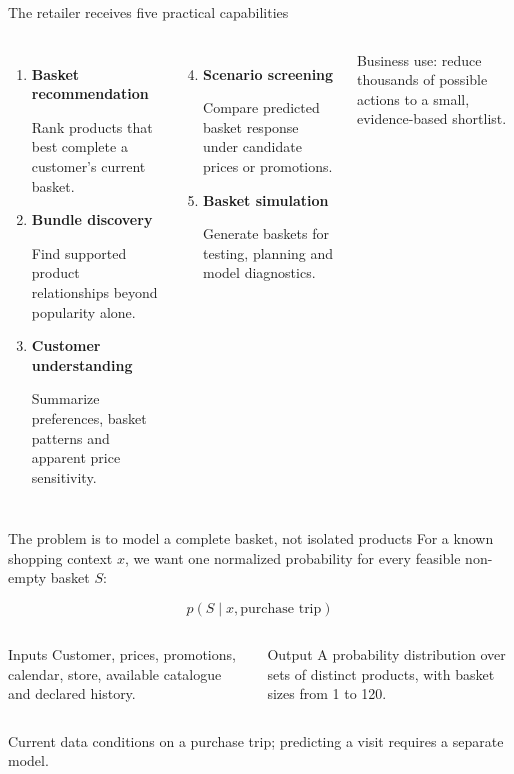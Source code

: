 \documentclass[aspectratio=169,11pt,t]{beamer}
\newcommand{\blue}[1]{\textcolor{Accent}{#1}}
\begin{document}
\begin{frame}{The retailer receives five practical capabilities}
\begin{columns}[T,onlytextwidth]
  \begin{enumerate}
    \item \textbf{Basket recommendation}\par
          Rank products that best complete a customer's current basket.
    \item \textbf{Bundle discovery}\par
          Find supported product relationships beyond popularity alone.
    \item \textbf{Customer understanding}\par
          Summarize preferences, basket patterns and apparent price sensitivity.
  \end{enumerate}

  \begin{enumerate}
    \setcounter{enumi}{3}
    \item \textbf{Scenario screening}\par
          Compare predicted basket response under candidate prices or promotions.
    \item \textbf{Basket simulation}\par
          Generate baskets for testing, planning and model diagnostics.
  \end{enumerate}

  \vspace{0.12cm}
  \blue{Business use: reduce thousands of possible actions to a small,
  evidence-based shortlist.}
\end{columns}
\end{frame}

\begin{frame}{The problem is to model a complete basket, not isolated products}
\small
For a known shopping context $x$, we want one normalized probability for every feasible
non-empty basket $S$:

\[
\boxed{\quad p(S\mid x,\text{purchase trip})\quad}
\]

\begin{columns}[T,onlytextwidth]
  \begin{block}{Inputs}
  Customer, prices, promotions, calendar, store, available catalogue and declared history.
  \end{block}

  \begin{block}{Output}
  A probability distribution over sets of distinct products, with basket sizes from 1 to
  120.
  \end{block}
\end{columns}

\small Current data conditions on a purchase trip; predicting a visit requires a separate model.
\end{frame}
\end{document}

